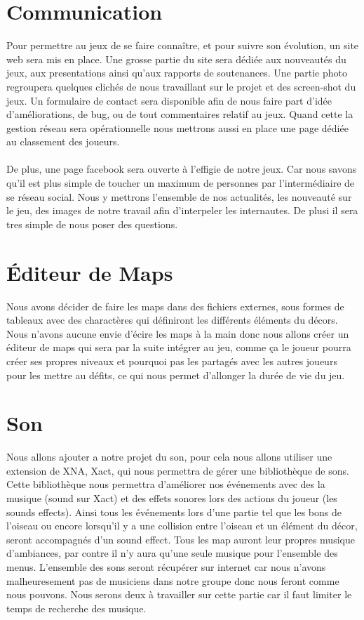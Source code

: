 \documentclass [11pt]{report}
\begin{document}
	\section {Communication}
	Pour permettre au jeux de se faire conna\^itre, et pour suivre son \'evolution, un site web sera mis en place. Une grosse partie du site sera dédiée aux nouveautés du jeux, aux presentations ainsi qu'aux rapports de soutenances. Une partie photo regroupera quelques clichés de nous travaillant sur le projet et des screen-shot du jeux. Un formulaire de contact sera disponible afin de nous faire part d'idée d'am\'eliorations, de bug, ou de tout commentaires relatif au jeux. Quand cette la gestion réseau sera opérationnelle nous mettrons aussi en place une page dédiée au classement des joueurs.
\\\\ \indent
	De plus, une page facebook sera ouverte à l'effigie de notre jeux. Car nous savons qu'il est plus simple de toucher un maximum de personnes par l'intermédiaire de se réseau social. Nous y mettrons l'ensemble de nos actualités, les nouveauté sur le jeu, des images de notre travail afin d'interpeler les internautes. De plusi il sera tres simple de nous poser des questions.

	\section {\'Editeur de Maps}
	Nous avons décider de faire les maps dans des fichiers externes, sous formes de tableaux avec des charactères qui définiront les différents éléments du décors. Nous n'avons aucune envie d'écire les maps à la main donc nous allons créer un éditeur de maps qui sera par la suite intégrer au jeu, comme ça le joueur pourra créer ses propres niveaux et pourquoi pas les partagés avec les autres joueurs pour les mettre au défits, ce qui nous permet d'allonger la durée de vie du jeu.

	\section {Son}
	Nous allons ajouter a notre projet du son, pour cela nous allons utiliser une extension de XNA, Xact, qui nous permettra de g\'erer une biblioth\`eque de sons. Cette biblioth\`eque nous permettra d'am\'eliorer nos \'ev\'enements avec des la musique (sound sur Xact) et des effets sonores lors des actions du joueur (les sounds effects). Ainsi tous les événements lors d'une partie tel que les bons de l'oiseau ou encore lorsqu'il y a une collision entre l'oiseau et un élément du décor, seront accompagnés d'un sound effect. Tous les map auront leur propres musique d'ambiances, par contre il n'y aura qu'une seule musique pour l'ensemble des menus. L'ensemble des sons seront récupérer sur internet car nous n'avons malheuresement pas de musiciens dans notre groupe donc nous feront comme nous pouvons. Nous serons deux à travailler sur cette partie car il faut limiter le temps de recherche des musique.
\end{document}
